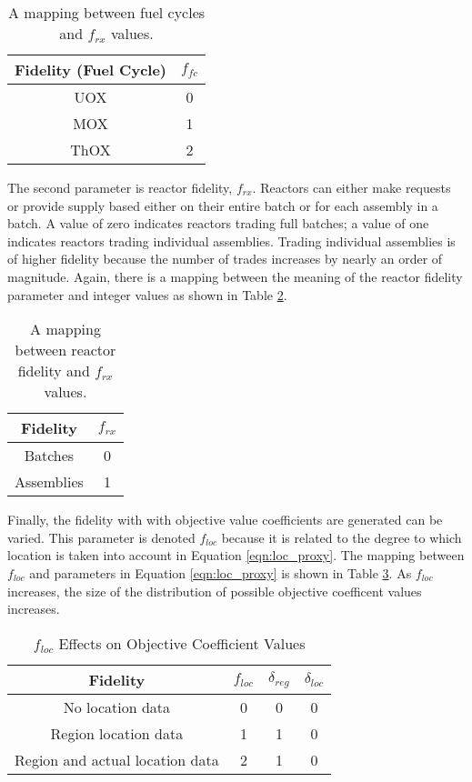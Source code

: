\begin{table}[h]
\centering
\caption{A mapping between fuel cycles and $f_{rx}$ values.}
\label{tbl:ffc}
\begin{tabular}{|c|c|}
\hline
Fidelity (Fuel Cycle)            & $f_{fc}$ \\ \hline
UOX                    & 0         \\ \hline
MOX                    & 1         \\ \hline
ThOX                    & 2         \\ \hline
\end{tabular}
\end{table}

The second parameter is reactor fidelity, $f_{rx}$. Reactors can either make
requests or provide supply based either on their entire batch or for each
assembly in a batch. A value of zero indicates reactors trading full batches; a
value of one indicates reactors trading individual assemblies. Trading
individual assemblies is of higher fidelity because the number of trades
increases by nearly an order of magnitude. Again, there is a mapping between the
meaning of the reactor fidelity parameter and integer values as shown in Table
\ref{tbl:frx}.

\begin{table}[h]
\centering
\caption{A mapping between reactor fidelity and $f_{rx}$ values.}
\label{tbl:frx}
\begin{tabular}{|c|c|}
\hline
Fidelity            & $f_{rx}$ \\ \hline
Batches                    & 0         \\ \hline
Assemblies                    & 1         \\ \hline
\end{tabular}
\end{table}

Finally, the fidelity with with objective value coefficients are generated can
be varied. This parameter is denoted $f_{loc}$ because it is related to the
degree to which location is taken into account in Equation
\ref{eqn:loc_proxy}. The mapping between $f_{loc}$ and parameters in Equation
\ref{eqn:loc_proxy} is shown in Table \ref{tbl:floc}. As $f_{loc}$ increases,
the size of the distribution of possible objective coefficent values increases.

\begin{table}[h]
\centering
\caption{$f_{loc}$ Effects on Objective Coefficient Values}
\label{tbl:floc}
\begin{tabular}{|c|c|c|c|}
\hline
Fidelity & $f_{loc}$ &$\delta_{reg}$ & $\delta_{loc}$ \\ \hline
No location data & 0  & 0          & 0 \\ \hline
Region location data & 1   & 1          & 0 \\ \hline
Region and actual location data & 2   & 1          & 0 \\ \hline
\end{tabular}
\end{table}

